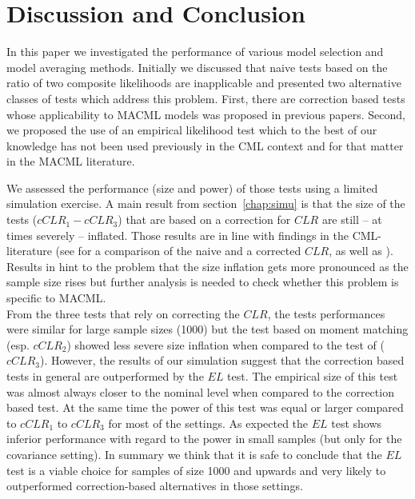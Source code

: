\documentclass[12pt, a4paper]{article}
\numberwithin{defcounter}{section}
\numberwithin{excounter}{section}
\begin{document}
\clearpage



\section{Discussion and Conclusion}

In this paper we  investigated the performance of various model selection and model averaging methods. Initially we discussed that naive tests based on the ratio of two composite likelihoods are inapplicable and presented two alternative classes of tests which address this problem. First, there are correction based tests whose applicability to \ac{MACML} models was proposed in previous papers. Second, we proposed the use of an empirical likelihood test which to the best of our knowledge has not been used previously in the \ac{CML} context and for that matter in the \ac{MACML} literature. 

We assessed the performance (size and power) of those tests using a limited simulation exercise. A main result from section~\ref{chap:simu} is that the size of the tests ($cCLR_1 - cCLR_3$) that are based on a correction for $CLR$ are still -- at times severely -- inflated. Those results are in line with findings in the \ac{CML}-literature (see \citep{chandler2007} for a comparison of the naive and a corrected $CLR$, as well as \citep{geys1999}). Results in \cite{geys1999} hint to the problem that the size inflation gets more pronounced as the sample size rises but further analysis is needed to check whether this problem is specific to \ac{MACML}. 
\\
From the three tests that rely on correcting the $CLR$, the tests performances were similar for large sample sizes (1000) but the test based on moment matching (esp. $cCLR_2$) showed less severe size inflation when compared to the test of \cite{pace2011} ($cCLR_3$).  However, the results of our simulation suggest that the correction based tests in general are outperformed by the $EL$ test. The empirical size of this test was almost always closer to the nominal level when compared to the correction based test. At the same time the power of this test was equal or larger compared to $cCLR_1$ to $cCLR_3$ for most of the settings. As expected the $EL$ test shows inferior performance with regard to the power in small samples (but only for the covariance setting). In summary we think that it is safe to conclude that the $EL$ test is a viable choice for samples of size 1000 and upwards and very likely to outperformed correction-based alternatives in those settings.
\end{document}
